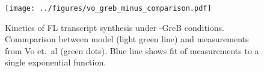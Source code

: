 

\begin{figure}
    \begin{center}
        \texttt{[image: ../figures/vo\_greb\_minus\_comparison.pdf]}
    \end{center}
    \caption{Kinetics of FL transcript synthesis under -GreB conditions.
      Commparison between model (light green line) and measurements from Vo
      et.\ al \cite{vo_vitro_2003-1} (green dots). Blue line shows fit of
      measurements to a single exponential function.}
\label{fig:vo_comparison}
\end{figure}





